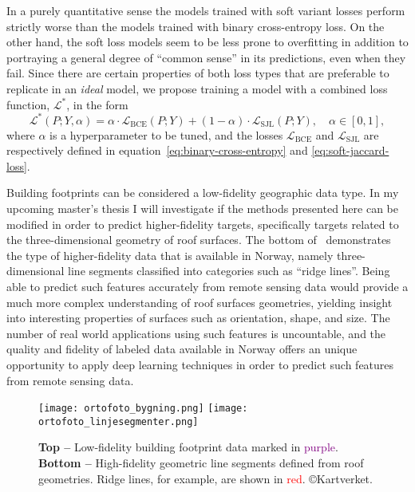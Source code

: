 In a purely quantitative sense the models trained with soft variant losses perform strictly worse than the models trained with binary cross-entropy loss.
On the other hand, the soft loss models seem to be less prone to overfitting in addition to portraying a general degree of \enquote{common sense} in its predictions, even when they fail.
Since there are certain properties of both loss types that are preferable to replicate in an \emph{ideal} model, we propose training a model with a combined loss function, $\mathcal{L}^{*}$, in the form
%
\begin{equation*}
  \mathcal{L}^{*}(P; Y, \alpha)
  =
  \alpha \cdot \mathcal{L}_{\mathrm{BCE}}(P; Y)
  +
  (1 - \alpha) \cdot \mathcal{L}_{\mathrm{SJL}}(P; Y),
  \quad \alpha \in [0, 1],
\end{equation*}
%
where $\alpha$ is a hyperparameter to be tuned, and the losses $\mathcal{L}_{\mathrm{BCE}}$ and $\mathcal{L}_{\mathrm{SJL}}$ are respectively defined in equation~\eqref{eq:binary-cross-entropy} and \eqref{eq:soft-jaccard-loss}.

Building footprints can be considered a low-fidelity geographic data type.
In my upcoming master's thesis I will investigate if the methods presented here can be modified in order to predict higher-fidelity targets, specifically targets related to the three-dimensional geometry of roof surfaces.
The bottom of~ demonstrates the type of higher-fidelity data that is available in Norway, namely three-dimensional line segments classified into categories such as \enquote{ridge lines}.
Being able to predict such features accurately from remote sensing data would provide a much more complex understanding of roof surfaces geometries, yielding insight into interesting properties of surfaces such as orientation, shape, and size.
The number of real world applications using such features is uncountable, and the quality and fidelity of labeled data available in Norway offers an unique opportunity to apply deep learning techniques in order to predict such features from remote sensing data.

\begin{figure}
  \texttt{[image: ortofoto\_bygning.png]}
  \texttt{[image: ortofoto\_linjesegmenter.png]}
  \caption{%
    \textbf{Top --} Low-fidelity building footprint data marked in \textcolor{purple}{purple}.
    \textbf{Bottom --} High-fidelity geometric line segments defined from roof geometries. Ridge lines, for example, are shown in \textcolor{red}{red}.
    \copyright{Kartverket}.
  }%
  \label{fig:higher-fidelity-data}
\end{figure}

